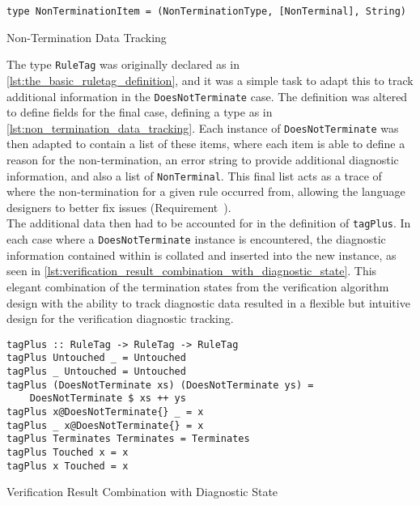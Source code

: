 \begin{listing}[!htb]
\begin{verbatim}
type NonTerminationItem = (NonTerminationType, [NonTerminal], String)
\end{verbatim}
\caption{Non-Termination Data Tracking}
\label{lst:non_termination_data_tracking}
\end{listing}

The type \texttt{RuleTag} was originally declared as in \autoref{lst:the_basic_ruletag_definition}, and it was a simple task to adapt this to track additional information in the \texttt{DoesNotTerminate} case.
The definition was altered to define fields for the final case, defining a type as in \autoref{lst:non_termination_data_tracking}.
Each instance of \texttt{DoesNotTerminate} was then adapted to contain a list of these items, where each item is able to define a reason for the non-termination, an error string to provide additional diagnostic information, and also a list of \texttt{NonTerminal}.
This final list acts as a trace of where the non-termination for a given rule occurred from, allowing the language designers to better fix issues (Requirement~).\\

The additional data then had to be accounted for in the definition of \texttt{tagPlus}.
In each case where a \texttt{DoesNotTerminate} instance is encountered, the diagnostic information contained within is collated and inserted into the new instance, as seen in \autoref{lst:verification_result_combination_with_diagnostic_state}.
This elegant combination of the termination states from the verification algorithm design with the ability to track diagnostic data resulted in a flexible but intuitive design for the verification diagnostic tracking.

\begin{listing}[!htb]
\begin{verbatim}
tagPlus :: RuleTag -> RuleTag -> RuleTag
tagPlus Untouched _ = Untouched
tagPlus _ Untouched = Untouched
tagPlus (DoesNotTerminate xs) (DoesNotTerminate ys) =
    DoesNotTerminate $ xs ++ ys
tagPlus x@DoesNotTerminate{} _ = x
tagPlus _ x@DoesNotTerminate{} = x
tagPlus Terminates Terminates = Terminates
tagPlus Touched x = x
tagPlus x Touched = x
\end{verbatim}
\caption{Verification Result Combination with Diagnostic State}
\label{lst:verification_result_combination_with_diagnostic_state}
\end{listing}

